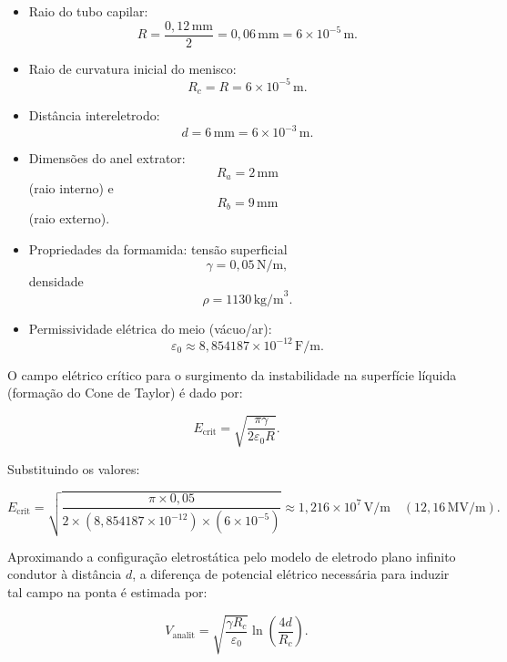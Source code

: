 \documentclass[12pt,a4paper]{article}
\begin{document}
\begin{itemize}
    \item Raio do tubo capilar:
    \[
    R = \frac{0{,}12\,\text{mm}}{2}
    = 0{,}06\,\text{mm}
    = 6 \times 10^{-5}\,\text{m}.
    \]

    \item Raio de curvatura inicial do menisco:
    \[
    R_c = R = 6 \times 10^{-5}\,\text{m}.
    \]

    \item Distância intereletrodo:
    \[
    d = 6\,\text{mm} = 6 \times 10^{-3}\,\text{m}.
    \]

    \item Dimensões do anel extrator:
    \[
    R_a = 2\,\text{mm}
    \]
    (raio interno) e
    \[
    R_b = 9\,\text{mm}
    \]
    (raio externo).

    \item Propriedades da formamida:
    tensão superficial
    \[
    \gamma = 0{,}05\,\text{N/m},
    \]
    densidade
    \[
    \rho = 1130\,\text{kg/m}^3.
    \]

    \item Permissividade elétrica do meio (vácuo/ar):
    \[
    \varepsilon_0 \approx 8{,}854187 \times 10^{-12}\,\text{F/m}.
    \]
\end{itemize}

O campo elétrico crítico para o surgimento da instabilidade na superfície líquida
(formação do Cone de Taylor) é dado por:

\begin{equation}
E_{\mathrm{crit}}
=
\sqrt{
\frac{\pi\gamma}
{2\varepsilon_0 R}
}.
\end{equation}

Substituindo os valores:

\begin{equation}
E_{\mathrm{crit}}
=
\sqrt{
\frac{\pi \times 0{,}05}
{2 \times (8{,}854187 \times 10^{-12})
\times (6 \times 10^{-5})}
}
\approx
1{,}216 \times 10^7\,\text{V/m}
\quad
(12{,}16\,\text{MV/m}).
\end{equation}

Aproximando a configuração eletrostática pelo modelo de eletrodo plano infinito
condutor à distância $d$, a diferença de potencial elétrico necessária para
induzir tal campo na ponta é estimada por:

\begin{equation}
V_{\mathrm{analit}}
=
\sqrt{
\frac{\gamma R_c}{\varepsilon_0}
}
\ln\left(
\frac{4d}{R_c}
\right).
\end{equation}
\end{document}
